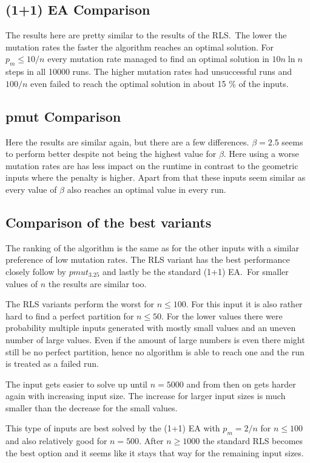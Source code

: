 \subsection{(1+1) EA Comparison}


The results here are pretty similar to the results of the RLS.\
The lower the mutation rates the faster the algorithm reaches an optimal solution.
For $p_m\le10/n$ every mutation rate managed to find an optimal solution in $10n\ln n$ steps in all 10000 runs.
The higher mutation rates had unsuccessful runs and $100/n$ even failed to reach the optimal solution in about 15 \% of the inputs.

\subsection{pmut Comparison}


Here the results are similar again, but there are a few differences.
$\beta=2.5$ seems to perform better despite not being the highest value for $\beta$.
Here using a worse mutation rates are has less impact on the runtime in contrast to the geometric inputs where the penalty is higher.
Apart from that these inputs seem similar as every value of $\beta$ also reaches an optimal value in every run.

\subsection{Comparison of the best variants}
% 
% 
The ranking of the algorithm is the same as for the other inputs with a similar preference of low mutation rates.
The RLS variant has the best performance closely follow by $pmut_{3.25}$ and lastly be the standard (1+1) EA.\
For smaller values of $n$ the results are similar too.


The RLS variants perform the worst for $n\le 100$.
For this input it is also rather hard to find a perfect partition for $n\le50$.
For the lower values there were probability multiple inputs generated with mostly small values and an uneven number of large values.
Even if the amount of large numbers is even there might still be no perfect partition, hence no algorithm is able to reach one and the run is treated as a failed run.



The input gets easier to solve up until $n=5000$ and from then on gets harder again with increasing input size.
The increase for larger input sizes is much smaller than the decrease for the small values.



This type of inputs are best solved by the (1+1) EA with $p_m=2/n$ for $n\le100$ and also relatively good for $n=500$.
After $n\ge1000$ the standard RLS becomes the best option and it seems like it stays that way for the remaining input sizes.
